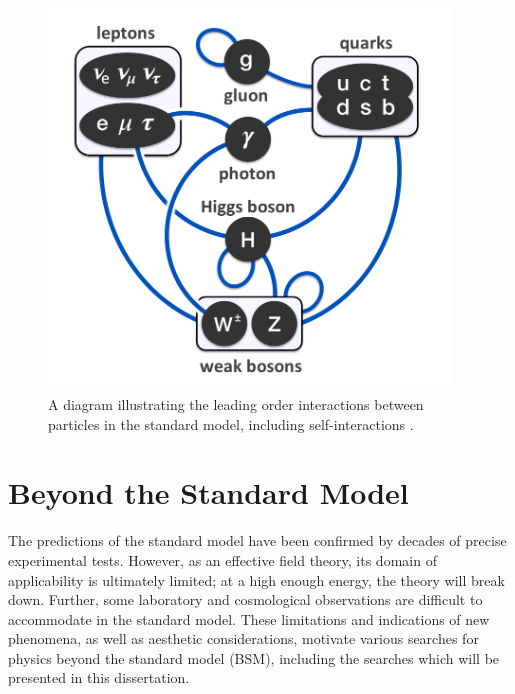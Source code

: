 \begin{figure}[hbt]
\begin{center}
\includegraphics[width=0.95\textwidth]{figures/Elementary_particle_interactions_in_the_Standard_Model.png}
\caption{A diagram illustrating the leading order interactions between particles in the standard model, including self-interactions \cite{Drexler}.}
\label{fig:sm-interactions}
\end{center}
\end{figure}

\section{Beyond the Standard Model}

The predictions of the standard model have been confirmed by decades of precise experimental tests. However, as an effective field theory, its domain of applicability is ultimately limited; at a high enough energy, the theory will break down. Further, some laboratory and cosmological observations are difficult to accommodate in the standard model. These limitations and indications of new phenomena, as well as aesthetic considerations, motivate various searches for physics beyond the standard model (BSM), including the searches which will be presented in this dissertation.


